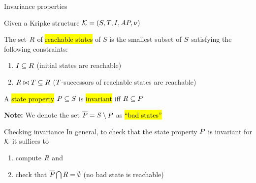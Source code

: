 \begin{frame}{Invariance properties}

Given a Kripke structure ${\cal K} = (S, T, I, AP, \nu)$

\bigskip
The set $R$ of \hl{reachable states} of $S$ is the smallest
subset of $S$ satisfying the following constraints:

\bigskip
\begin{enumerate}
  \itemsep1em
  \item $I \subseteq R$ \quad (initial states are reachable)
  \item $R \bowtie T \subseteq R$ \quad
    ($T$-successors of reachable states are reachable)
\end{enumerate}

\bigskip
A \hl{state property} $P \subseteq S$ is \hl{invariant} iff
$R \subseteq P$


\bigskip
\textbf{Note:} We denote the set $\overline{P} = S
\setminus P$ as \hl{``bad states''}
\end{frame}


\begin{frame}{Checking invariance}
In general, to check that the state property $P$ is invariant for ${\cal K}$
it suffices to

\begin{enumerate}
  \itemsep1em
  \item compute $R$ and
  \item check that $\overline{P} \bigcap R = \emptyset$ (no
  bad state is reachable)
\end{enumerate}

\bigskip
{}

\bigskip
{}
\end{frame}

